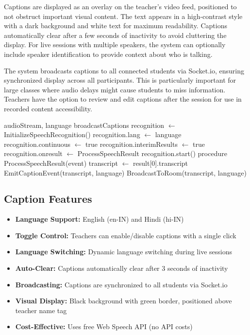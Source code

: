 \documentclass[onecolumn]{IEEEtran}
\begin{document}
Captions are displayed as an overlay on the teacher's video feed, positioned to not obstruct important visual content. The text appears in a high-contrast style with a dark background and white text for maximum readability. Captions automatically clear after a few seconds of inactivity to avoid cluttering the display. For live sessions with multiple speakers, the system can optionally include speaker identification to provide context about who is talking.

The system broadcasts captions to all connected students via Socket.io, ensuring synchronized display across all participants. This is particularly important for large classes where audio delays might cause students to miss information. Teachers have the option to review and edit captions after the session for use in recorded content accessibility.

\begin{algorithm}
\caption{Live Caption Generation}
\begin{algorithmic}[1]
\REQUIRE audioStream, language
\ENSURE broadcastCaptions
\STATE recognition $\leftarrow$ InitializeSpeechRecognition()
\STATE recognition.lang $\leftarrow$ language
\STATE recognition.continuous $\leftarrow$ true
\STATE recognition.interimResults $\leftarrow$ true
\STATE recognition.onresult $\leftarrow$ ProcessSpeechResult
\STATE recognition.start()
\RETURN
\STATE procedure ProcessSpeechResult(event)
\STATE transcript $\leftarrow$ result[0].transcript
\STATE EmitCaptionEvent(transcript, language)
\STATE BroadcastToRoom(transcript, language)
\ENDIF
\ENDFOR
\end{algorithmic}
\end{algorithm}

\subsection{Caption Features}

\begin{itemize}
\item \textbf{Language Support:} English (en-IN) and Hindi (hi-IN)
\item \textbf{Toggle Control:} Teachers can enable/disable captions with a single click
\item \textbf{Language Switching:} Dynamic language switching during live sessions
\item \textbf{Auto-Clear:} Captions automatically clear after 3 seconds of inactivity
\item \textbf{Broadcasting:} Captions are synchronized to all students via Socket.io
\item \textbf{Visual Display:} Black background with green border, positioned above teacher name tag
\item \textbf{Cost-Effective:} Uses free Web Speech API (no API costs)
\end{itemize}
\end{document}

